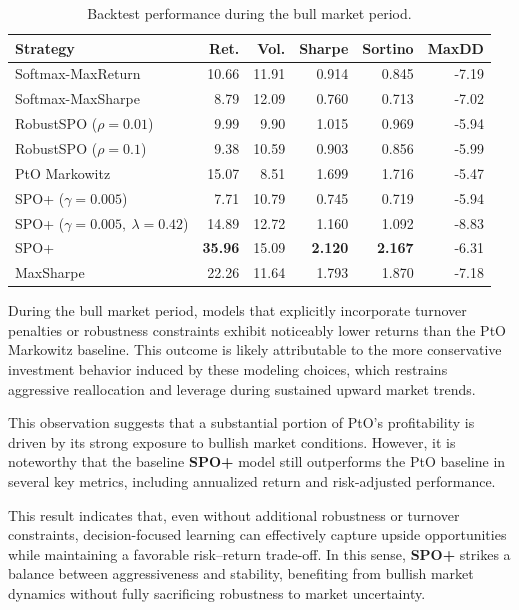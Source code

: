 \documentclass[review]{elsarticle}
\begin{document}
\begin{table}[htbp]
\centering
\caption{Backtest performance during the bull market period.}
\label{tab:bull_backtest}
\begin{tabular}{lrrrrr}
\toprule
\textbf{Strategy} &
\textbf{Ret.} &
\textbf{Vol.} &
\textbf{Sharpe} &
\textbf{Sortino} &
\textbf{MaxDD} \\
\midrule
Softmax-MaxReturn
 & 10.66 & 11.91 & 0.914 & 0.845 & -7.19 \\
Softmax-MaxSharpe
 & 8.79 & 12.09 & 0.760 & 0.713 & -7.02 \\
RobustSPO ($\rho=0.01$)
 & 9.99 & 9.90 & 1.015 & 0.969 & -5.94 \\
RobustSPO ($\rho=0.1$)
 & 9.38 & 10.59 & 0.903 & 0.856 & -5.99 \\
PtO Markowitz
 & 15.07 & 8.51 & 1.699 & 1.716 & -5.47 \\
SPO+ ($\gamma=0.005$)
 & 7.71 & 10.79 & 0.745 & 0.719 & -5.94 \\
SPO+ ($\gamma=0.005,\ \lambda=0.42$)
 & 14.89 & 12.72 & 1.160 & 1.092 & -8.83 \\
SPO+
 & \textbf{35.96} & 15.09 & \textbf{2.120} & \textbf{2.167} & -6.31 \\
MaxSharpe
 & 22.26 & 11.64 & 1.793 & 1.870 & -7.18 \\
\bottomrule
\end{tabular}
\end{table}

During the bull market period, models that explicitly incorporate turnover penalties or robustness constraints exhibit noticeably lower returns than the PtO Markowitz baseline.
This outcome is likely attributable to the more conservative investment behavior induced by these modeling choices, which restrains aggressive reallocation and leverage during sustained upward market trends.

This observation suggests that a substantial portion of PtO’s profitability is driven by its strong exposure to bullish market conditions.
However, it is noteworthy that the baseline \textbf{SPO+} model still outperforms the PtO baseline in several key metrics, including annualized return and risk-adjusted performance.

This result indicates that, even without additional robustness or turnover constraints, decision-focused learning can effectively capture upside opportunities while maintaining a favorable risk--return trade-off.
In this sense, \textbf{SPO+} strikes a balance between aggressiveness and stability, benefiting from bullish market dynamics without fully sacrificing robustness to market uncertainty.
\end{document}
